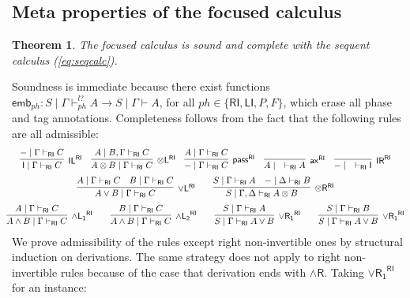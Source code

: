 \documentclass[submission,copyright,creativecommons]{eptcs}
\newtheorem{theorem}{Theorem}[section]
\theoremstyle{definition}
\newcommand{\tl}{\otimes \mathsf{L}}
\newcommand{\tr}{\otimes \mathsf{R}}
\newcommand{\pass}{\mathsf{pass}}
\newcommand{\unitl}{\mathsf{IL}}
\newcommand{\unitr}{\mathsf{IR}}
\newcommand{\andlone}{\land \mathsf{L_{1}}}
\newcommand{\andltwo}{\land \mathsf{L_{2}}}
\newcommand{\andr}{\land \mathsf{R}}
\newcommand{\orl}{\lor \mathsf{L}}
\newcommand{\orrone}{\lor \mathsf{R_{1}}}
\newcommand{\ax}{\mathsf{ax}}
\newcommand{\ot}{\otimes}
\newcommand{\I}{\mathsf{I}}
\newcommand{\RI}{\mathsf{RI}}
\newcommand{\LI}{\mathsf{LI}}
\begin{document}
\subsection{Meta properties of the focused calculus}
\begin{theorem}\label{theorem:focus:sound:complete}
  The focused calculus is sound and complete with the sequent calculus (\ref{eq:seqcalc}).
\end{theorem}
Soundness is immediate because there exist functions $\mathsf{emb}_{ph} : S \mid \Gamma \vdash^{l?}_{ph} A \to S \mid \Gamma \vdash A$, for all $ph \in \{ \RI , \LI , P , F \}$, which erase all phase and tag annotations.
Completeness follows from the fact that the following rules are all admissible:
\begin{equation}\label{eq:admis}
  \hspace*{-4mm}
    \begin{array}{c}
      \infer[\unitl^{\RI}]{\I \mid \Gamma \vdash_{\RI} C}{{-} \mid \Gamma \vdash_{\RI} C}
      \quad
      \infer[\tl^{\RI}]{A \ot B \mid \Gamma \vdash_{\RI} C}{A \mid B, \Gamma \vdash_{\RI} C}
      \quad
      \infer[\pass^{\RI}]{{-} \mid \Gamma \vdash_{\RI} C}{A \mid \Gamma \vdash_{\RI} C}
      \quad
      \infer[\ax^{\RI}]{A \mid \quad \vdash_{\RI} A}{}
      \quad
      \infer[\unitr^{\RI}]{{-} \mid \quad \vdash_{\RI} \I}{}
  \\[6pt]
      \infer[\orl^{\RI}]{A \lor B \mid \Gamma \vdash_{\RI} C}{
      A \mid \Gamma \vdash_{\RI} C
      &
      B \mid \Gamma \vdash_{\RI} C
      }
      \qquad
      \infer[\tr^{\RI}]{S \mid \Gamma , \Delta \vdash_{\RI} A \ot B}{
        S \mid \Gamma \vdash_{\RI} A
        &
        {-} \mid \Delta \vdash_{\RI} B
      }
  \\[6pt]
      \infer[\andlone^{\RI}]{A \land B \mid \Gamma \vdash_{\RI} C}{A \mid \Gamma \vdash_{\RI} C}
      \qquad
      \infer[\andltwo^{\RI}]{A \land B \mid \Gamma \vdash_{\RI} C}{B \mid \Gamma \vdash_{\RI} C}
      \qquad
      \infer[\orrone^{\RI}]{S \mid \Gamma \vdash_{\RI} A \lor B}{S \mid \Gamma \vdash_{\RI} A}
      \qquad
      \infer[\orrone^{\RI}]{S \mid \Gamma \vdash_{\RI} A \lor B}{S \mid \Gamma \vdash_{\RI} B}
    \end{array}
  \end{equation}
We prove admissibility of the rules except right non-invertible ones by structural induction on derivations.
The same strategy does not apply to right non-invertible rules because of the case that derivation ends with $\andr$.
Taking $\orrone^{\RI}$ for an instance:
\end{document}
